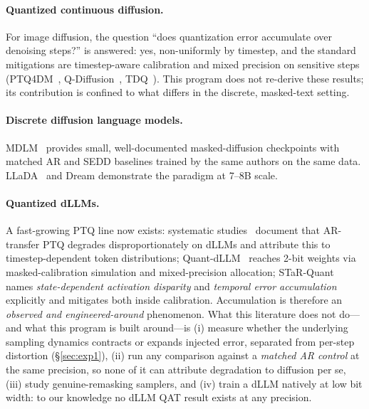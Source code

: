 \documentclass[11pt]{article}
\begin{document}
\paragraph{Quantized continuous diffusion.} For image diffusion, the question ``does quantization error accumulate over denoising steps?'' is answered: yes, non-uniformly by timestep, and the standard mitigations are timestep-aware calibration and mixed precision on sensitive steps (PTQ4DM~\cite{ptq4dm}, Q-Diffusion~\cite{qdiffusion}, TDQ~\cite{tdq}). This program does not re-derive these results; its contribution is confined to what differs in the discrete, masked-text setting.

\paragraph{Discrete diffusion language models.} MDLM~\cite{mdlm} provides small, well-documented masked-diffusion checkpoints with matched AR and SEDD baselines trained by the same authors on the same data. LLaDA~\cite{llada} and Dream demonstrate the paradigm at 7--8B scale.

\paragraph{Quantized dLLMs.} A fast-growing PTQ line now exists: systematic studies~\cite{dllmquant,qdlmstudy} document that AR-transfer PTQ degrades disproportionately on dLLMs and attribute this to timestep-dependent token distributions; Quant-dLLM~\cite{quantdllm} reaches 2-bit weights via masked-calibration simulation and mixed-precision allocation; STaR-Quant~\cite{starquant} names \emph{state-dependent activation disparity} and \emph{temporal error accumulation} explicitly and mitigates both inside calibration. Accumulation is therefore an \emph{observed and engineered-around} phenomenon. What this literature does not do---and what this program is built around---is (i) measure whether the underlying sampling dynamics contracts or expands injected error, separated from per-step distortion (\S\ref{sec:exp1}), (ii) run any comparison against a \emph{matched AR control} at the same precision, so none of it can attribute degradation to diffusion per se, (iii) study genuine-remasking samplers, and (iv) train a dLLM natively at low bit width: to our knowledge no dLLM QAT result exists at any precision.
\end{document}
